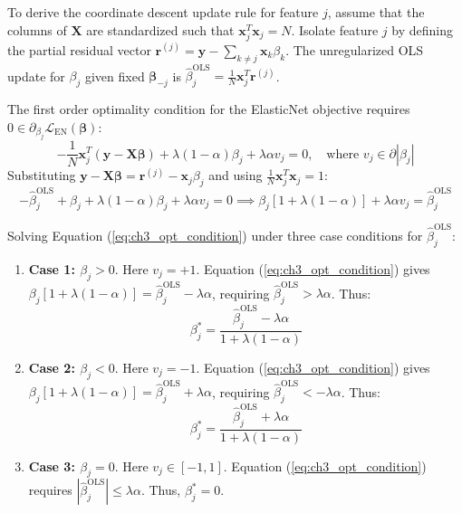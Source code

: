 To derive the coordinate descent update rule for feature $j$, assume that the columns of $\mathbf{X}$ are standardized such that $\mathbf{x}_j^T \mathbf{x}_j = N$. Isolate feature $j$ by defining the partial residual vector $\mathbf{r}^{(j)} = \mathbf{y} - \sum_{k \neq j} \mathbf{x}_k \beta_k$. The unregularized OLS update for $\beta_j$ given fixed $\boldsymbol{\beta}_{-j}$ is $\hat{\beta}_j^{\text{OLS}} = \frac{1}{N} \mathbf{x}_j^T \mathbf{r}^{(j)}$.

The first order optimality condition for the ElasticNet objective requires $0 \in \partial_{\beta_j} \mathcal{L}_{\text{EN}}(\boldsymbol{\beta})$:
\begin{equation}
-\frac{1}{N} \mathbf{x}_j^T (\mathbf{y} - \mathbf{X}\boldsymbol{\beta}) + \lambda(1-\alpha)\beta_j + \lambda \alpha v_j = 0, \quad \text{where } v_j \in \partial |\beta_j|
\end{equation}
Substituting $\mathbf{y} - \mathbf{X}\boldsymbol{\beta} = \mathbf{r}^{(j)} - \mathbf{x}_j \beta_j$ and using $\frac{1}{N}\mathbf{x}_j^T \mathbf{x}_j = 1$:
\begin{equation}
-\hat{\beta}_j^{\text{OLS}} + \beta_j + \lambda(1-\alpha)\beta_j + \lambda \alpha v_j = 0 \implies \beta_j [ 1 + \lambda(1-\alpha) ] + \lambda \alpha v_j = \hat{\beta}_j^{\text{OLS}}
\label{eq:ch3_opt_condition}
\end{equation}

Solving Equation (\ref{eq:ch3_opt_condition}) under three case conditions for $\hat{\beta}_j^{\text{OLS}}$:
\begin{enumerate}
    \item \textbf{Case 1: $\beta_j > 0$}. Here $v_j = +1$. Equation (\ref{eq:ch3_opt_condition}) gives $\beta_j [1 + \lambda(1-\alpha)] = \hat{\beta}_j^{\text{OLS}} - \lambda \alpha$, requiring $\hat{\beta}_j^{\text{OLS}} > \lambda \alpha$. Thus:
    $$\beta_j^* = \frac{\hat{\beta}_j^{\text{OLS}} - \lambda \alpha}{1 + \lambda(1-\alpha)}$$
    \item \textbf{Case 2: $\beta_j < 0$}. Here $v_j = -1$. Equation (\ref{eq:ch3_opt_condition}) gives $\beta_j [1 + \lambda(1-\alpha)] = \hat{\beta}_j^{\text{OLS}} + \lambda \alpha$, requiring $\hat{\beta}_j^{\text{OLS}} < -\lambda \alpha$. Thus:
    $$\beta_j^* = \frac{\hat{\beta}_j^{\text{OLS}} + \lambda \alpha}{1 + \lambda(1-\alpha)}$$
    \item \textbf{Case 3: $\beta_j = 0$}. Here $v_j \in [-1, 1]$. Equation (\ref{eq:ch3_opt_condition}) requires $|\hat{\beta}_j^{\text{OLS}}| \le \lambda \alpha$. Thus, $\beta_j^* = 0$.
\end{enumerate}

